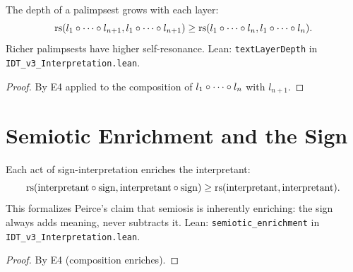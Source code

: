 \begin{theorem}
\label{thm:textual-depth}
The depth of a palimpsest grows with each layer:
\[
\mathrm{rs}(l_1 \circ \cdots \circ l_{n+1}, l_1 \circ \cdots \circ l_{n+1})
\geq \mathrm{rs}(l_1 \circ \cdots \circ l_n, l_1 \circ \cdots \circ l_n).
\]
Richer palimpsests have higher self-resonance.
Lean: \texttt{textLayerDepth} in \texttt{IDT\_v3\_Interpretation.lean}.
\end{theorem}

\begin{proof}
By E4 applied to the composition of $l_1 \circ \cdots \circ l_n$
with $l_{n+1}$.
\end{proof}

\section{Semiotic Enrichment and the Sign}

\begin{theorem}
\label{thm:semiotic-enrichment}
Each act of sign-interpretation enriches the interpretant:
\[
\mathrm{rs}(\mathrm{interpretant} \circ \mathrm{sign}, \mathrm{interpretant} \circ \mathrm{sign})
\geq \mathrm{rs}(\mathrm{interpretant}, \mathrm{interpretant}).
\]
This formalizes Peirce's claim that semiosis is inherently enriching:
the sign always adds meaning, never subtracts it.
Lean: \texttt{semiotic\_enrichment} in \texttt{IDT\_v3\_Interpretation.lean}.
\end{theorem}

\begin{proof}
By E4 (composition enriches).
\end{proof}

